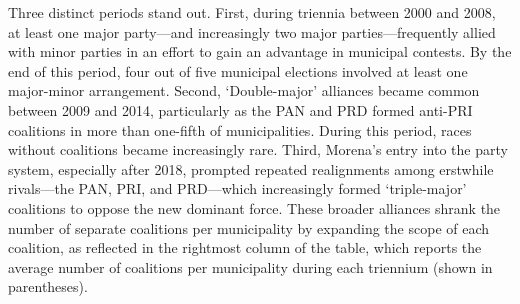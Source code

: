 \documentclass[letter,12pt]{article}
\begin{document}
Three distinct periods stand out. First, during triennia between 2000 and 2008, at least one major party---and increasingly two major parties---frequently allied with minor parties in an effort to gain an advantage in municipal contests. By the end of this period, four out of five municipal elections involved at least one major-minor arrangement. Second, `Double-major' alliances became common between 2009 and 2014, particularly as the PAN and PRD formed anti-PRI coalitions in more than one-fifth of municipalities. During this period, races without coalitions became increasingly rare. Third, Morena's entry into the party system, especially after 2018, prompted repeated realignments among erstwhile rivals---the PAN, PRI, and PRD---which increasingly formed `triple-major' coalitions to oppose the new dominant force. These broader alliances shrank the number of separate coalitions per municipality by expanding the scope of each coalition, as reflected in the rightmost column of the table, which reports the average number of coalitions per municipality during each triennium (shown in parentheses).

\end{document}
